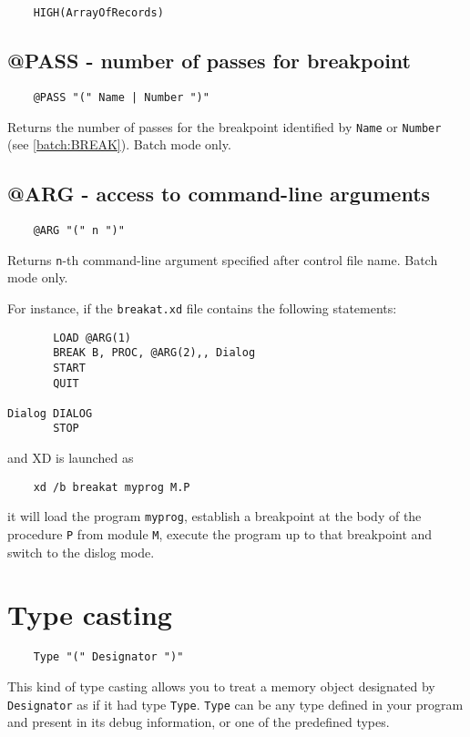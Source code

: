 \verb'    HIGH(ArrayOfRecords)'

\subsection{@PASS - number of passes for breakpoint}
\label{expr:builtin:pass}


\verb'    @PASS "(" Name | Number ")"'

Returns the number of passes for the breakpoint identified by \verb'Name' or
\verb'Number' (see \ref{batch:BREAK}). Batch mode only.

\subsection{@ARG - access to command-line arguments}
\label{expr:builtin:arg}


\verb'    @ARG "(" n ")"'

Returns \verb'n'-th command-line argument specified after control file 
name. Batch mode only.

For instance, if the \verb'breakat.xd' file contains the following
statements:

\begin{verbatim}
       LOAD @ARG(1)
       BREAK B, PROC, @ARG(2),, Dialog
       START                              
       QUIT

Dialog DIALOG
       STOP
\end{verbatim}
 
and XD is launched as

\verb'    xd /b breakat myprog M.P'

it will load the program \verb'myprog', establish a breakpoint at the 
body of the procedure \verb'P' from module \verb'M', execute
the program up to that breakpoint and switch to the dislog mode.

\section{Type casting}
\label{expr:casting}

\verb'    Type "(" Designator ")"'

This kind of type casting allows you to treat a memory object designated by
\verb'Designator' as if it had type \verb'Type'. \verb'Type' can be any type
defined in your program and present in its debug information, or one of the
predefined types.

